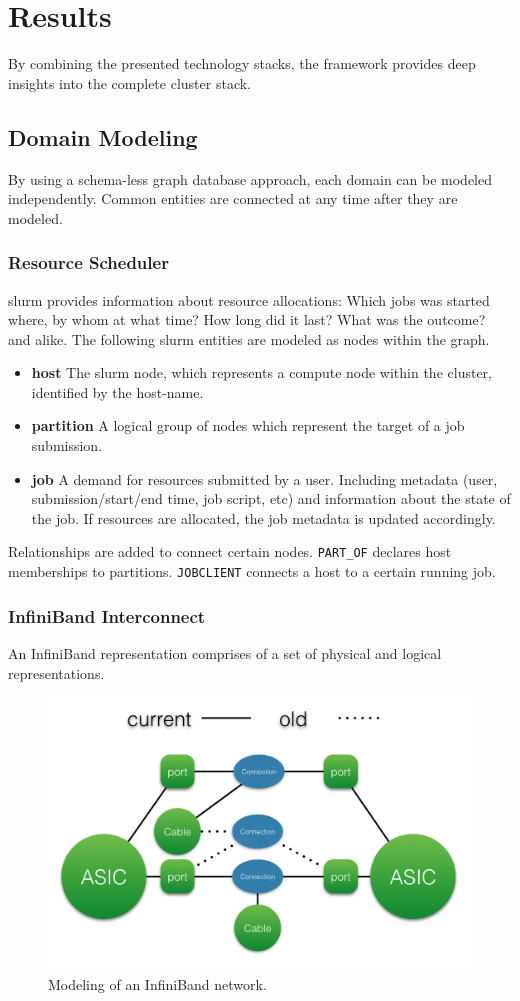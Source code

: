 \section{Results}
By combining the presented technology stacks, the framework provides deep insights into the complete cluster stack.

\subsection{Domain Modeling}
By using a schema-less graph database approach, each domain can be modeled independently. Common entities are connected at any time after
they are modeled.

\subsubsection{Resource Scheduler}
\gls{slurm} provides information about resource allocations: Which jobs was started where, by whom at what time? How long did it last? What was the outcome? and alike.
The following \gls{slurm} entities are modeled as nodes within the graph.
\begin{itemize}
    \item \textbf{host} The \gls{slurm} node, which represents a compute node within the cluster, identified by the host-name.
    \item \textbf{partition} A logical group of nodes which represent the target of a job submission.
    \item \textbf{job} A demand for resources submitted by a user. Including metadata (user, submission/start/end time, job script, etc) and information about the state of the job. If resources are allocated, the job metadata is updated accordingly.
\end{itemize}
Relationships are added to connect certain nodes. \lstinline{PART_OF} declares host memberships to partitions. \lstinline{JOBCLIENT} connects a host to a certain running job.

\subsubsection{InfiniBand Interconnect}
An InfiniBand representation comprises of a set of physical and logical representations.
\begin{figure}[!ht]
    \includegraphics[width=.4\textwidth]{images/png/infiniband_graph.png}
    \caption{\label{fig:ib_graph}Modeling of an InfiniBand network.}
\end{figure}

